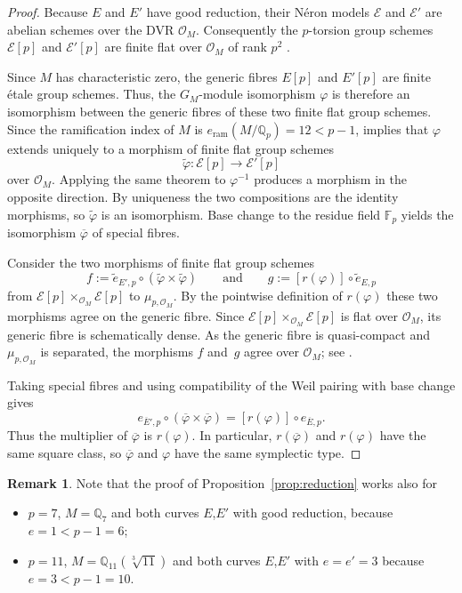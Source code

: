 \documentclass[12pt]{amsart}
\numberwithin{equation}{section}
\theoremstyle{definition}
\newtheorem{remark}[equation]{Remark}
\newcommand{\Q}{\mathbb{Q}}
\begin{document}
\begin{proof}
Because \(E\) and \(E'\) have good reduction, their N\'eron models \(\mathcal{E}\) and \(\mathcal{E}'\) are abelian schemes over the DVR \(\mathcal{O}_M\). Consequently the \(p\)-torsion group schemes \(\mathcal{E}[p]\) and \(\mathcal{E}'[p]\) are finite flat over \(\mathcal{O}_M\) of rank \(p^2\) \cite[Proposition~20.7]{MilneAbelianVarieties}.

Since $M$ has characteristic zero, the generic fibres $E[p]$ and
$E'[p]$ are finite \'etale group schemes.
Thus, the \(G_M\)-module isomorphism \(\varphi\) is therefore an isomorphism between the generic fibres of these two finite flat group schemes. Since the ramification index of $M$ is \(e_{\text{ram}}(M/\mathbb{Q}_p)=12<p-1\), \cite[Corollaire~3.3.6]{Raynaud} implies that \(\varphi\) extends uniquely to a morphism of finite flat group schemes
\[
\widetilde{\varphi}:\mathcal{E}[p]\longrightarrow\mathcal{E}'[p]
\]
over \(\mathcal{O}_M\). Applying the same theorem to \(\varphi^{-1}\) produces a morphism in the opposite direction. By uniqueness the two compositions are the identity morphisms, so \(\widetilde{\varphi}\) is an isomorphism. Base change to the residue field \(\mathbb{F}_p\) yields the isomorphism \(\overline{\varphi}\) of special fibres.

Consider the two morphisms of finite flat group schemes
\[
f:=\widetilde{e}_{E',p}\circ(\widetilde{\varphi}\times\widetilde{\varphi})
\qquad\text{and}\qquad
g:=[r(\varphi)]\circ\widetilde{e}_{E,p}
\]
from \(\mathcal{E}[p]\times_{\mathcal{O}_M}\mathcal{E}[p]\) to \(\mu_{p,\mathcal{O}_M}\). By the pointwise definition of \(r(\varphi)\) these two morphisms agree on the generic fibre. 
Since
$\mathcal E[p]\times_{\mathcal O_M}\mathcal E[p]$
is flat over $\mathcal O_M$, its generic fibre is schematically dense.
As the generic fibre is quasi-compact and $\mu_{p,\mathcal O_M}$ is
separated, the morphisms $f$ and~$g$ agree over $\mathcal O_M$; 
see \cite[Tags~\texttt{081H}, \texttt{01RD}, \texttt{01RH}]{Stacks}.

Taking special fibres and using compatibility of the Weil pairing with
base change gives
\[
    e_{\overline E',p}
    \circ
    (\overline\varphi\times\overline\varphi)
    =
    [r(\varphi)]\circ e_{\overline E,p}.
\]
Thus the multiplier of $\overline\varphi$ is $r(\varphi)$. In
particular, $r(\overline\varphi)$ and $r(\varphi)$ have the same square
class, so $\overline\varphi$ and $\varphi$ have the same symplectic
type. 
\end{proof}
\begin{remark} \label{rmk:reduction}
    Note that the proof of Proposition~\ref{prop:reduction} works also for
    \begin{itemize}
        \item $p=7$, $M=\Q_7$ and both curves $E$,$E'$ with good reduction, because $e=1<p-1=6$; 
        \item $p=11$, $M=\Q_{11}(\sqrt[3]{11})$ and both curves $E$,$E'$ with $e=e'=3$ because $e=3<p-1=10$.
    \end{itemize}
\end{remark}
\end{document}

